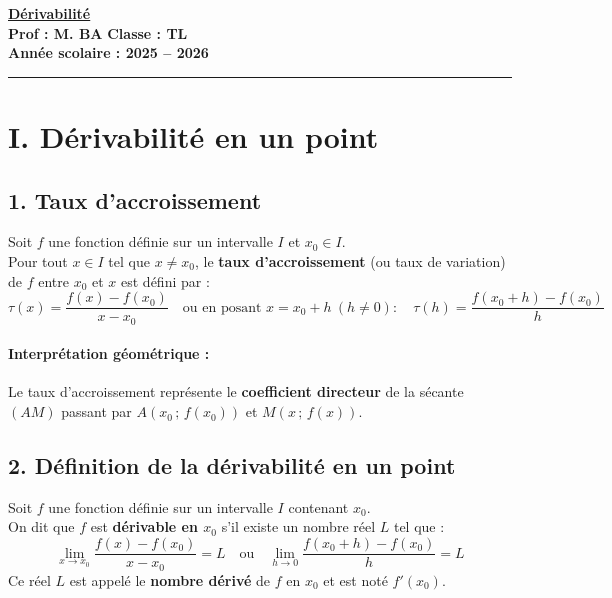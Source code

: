 \documentclass[12pt,a4paper]{article}
\begin{document}
\begin{center}
    \Large\textbf{\underline{\textcolor{myred}{Dérivabilité}}}\\[0.2cm]
    \normalsize\textbf{Prof : M. BA} \hfill \textbf{Classe : TL}\\[0.1cm]
    \textbf{Année scolaire : 2025 -- 2026}
\end{center}
\hrule
\vspace{0.5cm}


\section*{\color{myred}I. Dérivabilité en un point}

\subsection*{\color{myred}1. Taux d'accroissement}

\begin{tcolorbox}[colback=red!5!white,colframe=myred,title=\textbf{Définition : Taux d'accroissement}]
Soit $f$ une fonction définie sur un intervalle $I$ et $x_0 \in I$.\\
Pour tout $x \in I$ tel que $x \neq x_0$, le \textbf{taux d'accroissement} (ou taux de variation) de $f$ entre $x_0$ et $x$ est défini par :
\[
\tau(x) = \frac{f(x) - f(x_0)}{x - x_0} \quad \text{ou en posant } x = x_0 + h \ (h \neq 0) : \quad \tau(h) = \frac{f(x_0 + h) - f(x_0)}{h}
\]
\end{tcolorbox}

\paragraph{Interprétation géométrique :} 
Le taux d'accroissement représente le \textbf{coefficient directeur} de la sécante $(AM)$ passant par $A(x_0 \,;\, f(x_0))$ et $M(x \,;\, f(x))$.


\subsection*{\color{myred}2. Définition de la dérivabilité en un point}

\begin{tcolorbox}[colback=blue!5!white,colframe=myblue,title=\textbf{Définition : Nombre dérivé}]
Soit $f$ une fonction définie sur un intervalle $I$ contenant $x_0$.\\
On dit que $f$ est \textbf{dérivable en $x_0$} s'il existe un nombre réel $L$ tel que :
\[
\lim_{x \to x_0} \frac{f(x) - f(x_0)}{x - x_0} = L \quad \text{ou} \quad \lim_{h \to 0} \frac{f(x_0 + h) - f(x_0)}{h} = L
\]
Ce réel $L$ est appelé le \textbf{nombre dérivé} de $f$ en $x_0$ et est noté $f'(x_0)$.
\end{tcolorbox}
\end{document}
